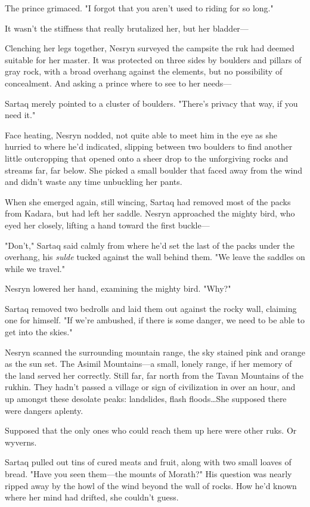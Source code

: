 The prince grimaced.
"I forgot that you aren't used to riding for so long."

It wasn't the stiffness that really brutalized her, but her bladder---

Clenching her legs together, Nesryn surveyed the campsite the ruk had deemed suitable for her master.
It was protected on three sides by boulders and pillars of gray rock, with a broad overhang against the elements, but no possibility of concealment.
And asking a prince where to see to her needs---

Sartaq merely pointed to a cluster of boulders.
"There's privacy that way, if you need it."

Face heating, Nesryn nodded, not quite able to meet him in the eye as she hurried to where he'd indicated, slipping between two boulders to find another little outcropping that opened onto a sheer drop to the unforgiving rocks and streams far, far below.
She picked a small boulder that faced away from the wind and didn't waste any time unbuckling her pants.

When she emerged again, still wincing, Sartaq had removed most of the packs from Kadara, but had left her saddle.
Nesryn approached the mighty bird, who eyed her closely, lifting a hand toward the first buckle---

"Don't," Sartaq said calmly from where he'd set the last of the packs under the overhang, his \emph{sulde} tucked against the wall behind them.
"We leave the saddles on while we travel."

Nesryn lowered her hand, examining the mighty bird.
"Why?"

Sartaq removed two bedrolls and laid them out against the rocky wall, claiming one for himself.
"If we're ambushed, if there is some danger, we need to be able to get into the skies."

Nesryn scanned the surrounding mountain range, the sky stained pink and orange as the sun set.
The Asimil Mountains---a small, lonely range, if her memory of the land served her correctly.
Still far, far north from the Tavan Mountains of the rukhin.
They hadn't passed a village or sign of civilization in over an hour, and up amongst these desolate peaks:
landslides, flash floods\ldots She supposed there were dangers aplenty.

Supposed that the only ones who could reach them up here were other ruks.
Or wyverns.

Sartaq pulled out tins of cured meats and fruit, along with two small loaves of bread.
"Have you seen them---the mounts of Morath?"
His question was nearly ripped away by the howl of the wind beyond the wall of rocks.
How he'd known where her mind had drifted, she couldn't guess.

